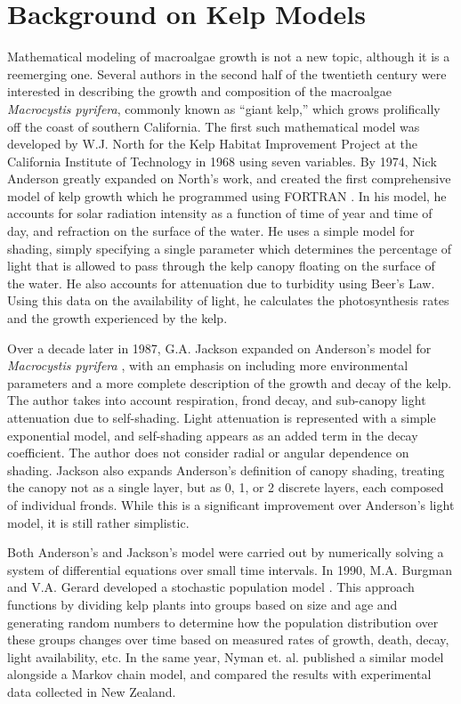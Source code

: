 \section{Background on Kelp Models}

Mathematical modeling of macroalgae growth is not a new topic, although it is a reemerging one.
Several authors in the second half of the twentieth century were interested in describing the growth and composition of the macroalgae \textit{Macrocystis pyrifera}, commonly known as ``giant kelp,'' which grows prolifically off the coast of southern California.
The first such mathematical model was developed by W.J. North for the Kelp Habitat Improvement Project at the California Institute of Technology in 1968 using seven variables.
By 1974, Nick Anderson greatly expanded on North's work, and created the first comprehensive model of kelp growth which he programmed using FORTRAN \cite{anderson_mathematical_1974}.
In his model, he accounts for solar radiation intensity as a function of time of year and time of day, and refraction on the surface of the water.
He uses a simple model for shading, simply specifying a single parameter which determines the percentage of light that is allowed to pass through the kelp canopy floating on the surface of the water.
He also accounts for attenuation due to turbidity using Beer's Law.
Using this data on the availability of light, he calculates the photosynthesis rates and the growth experienced by the kelp.

Over a decade later in 1987, G.A.
Jackson expanded on Anderson's model for \textit{Macrocystis pyrifera} \cite{jackson_modelling_1987}, with an emphasis on including more environmental parameters and a more complete description of the growth and decay of the kelp. 
The author takes into account respiration, frond decay, and sub-canopy light attenuation due to self-shading.
Light attenuation is represented with a simple exponential model, and self-shading appears as an added term in the decay coefficient.
The author does not consider radial or angular dependence on shading.
Jackson also expands Anderson's definition of canopy shading, treating the canopy not as a single layer, but as 0, 1, or 2 discrete layers, each composed of individual fronds.
While this is a significant improvement over Anderson's light model, it is still rather simplistic.

Both Anderson's and Jackson's model were carried out by numerically solving a system of differential equations over small time intervals.
In 1990, M.A. Burgman and V.A. Gerard developed a stochastic population model \cite{burgman_stage-structured_1990}.
This approach functions by dividing kelp plants into groups based on size and age and generating random numbers to determine how the population distribution over these groups changes over time based on measured rates of growth, death, decay, light availability, etc.
In the same year, Nyman et. al. \cite{nyman_macrocystis_1990} published a similar model alongside a Markov chain model, and compared the results with experimental data collected in New Zealand.

